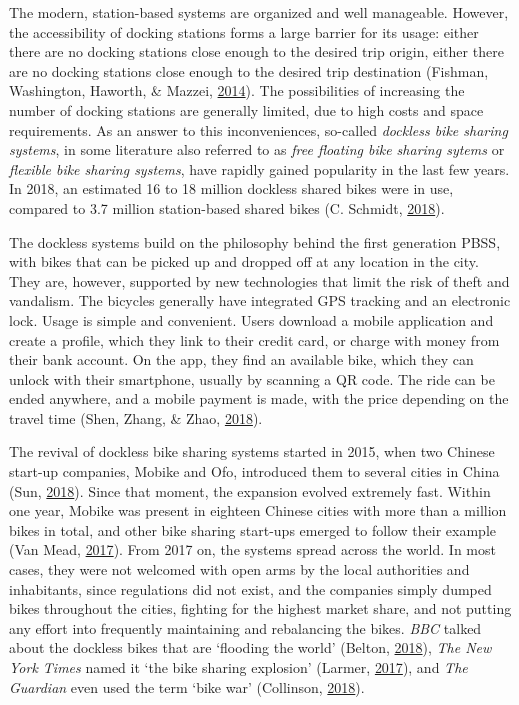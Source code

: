 \documentclass[12pt,oneside]{reedthesis}
\begin{document}
The modern, station-based systems are organized and well manageable.
However, the accessibility of docking stations forms a large barrier for
its usage: either there are no docking stations close enough to the
desired trip origin, either there are no docking stations close enough
to the desired trip destination (Fishman, Washington, Haworth, \&
Mazzei, \protect\hyperlink{ref-fishman2014}{2014}). The possibilities of
increasing the number of docking stations are generally limited, due to
high costs and space requirements. As an answer to this inconveniences,
so-called \emph{dockless bike sharing systems}, in some literature also
referred to as \emph{free floating bike sharing sytems} or
\emph{flexible bike sharing systems}, have rapidly gained popularity in
the last few years. In 2018, an estimated 16 to 18 million dockless
shared bikes were in use, compared to 3.7 million station-based shared
bikes (C. Schmidt, \protect\hyperlink{ref-schmidt2018}{2018}).

The dockless systems build on the philosophy behind the first generation
PBSS, with bikes that can be picked up and dropped off at any location
in the city. They are, however, supported by new technologies that limit
the risk of theft and vandalism. The bicycles generally have integrated
GPS tracking and an electronic lock. Usage is simple and convenient.
Users download a mobile application and create a profile, which they
link to their credit card, or charge with money from their bank account.
On the app, they find an available bike, which they can unlock with
their smartphone, usually by scanning a QR code. The ride can be ended
anywhere, and a mobile payment is made, with the price depending on the
travel time (Shen, Zhang, \& Zhao,
\protect\hyperlink{ref-shen2018}{2018}).

The revival of dockless bike sharing systems started in 2015, when two
Chinese start-up companies, Mobike and Ofo, introduced them to several
cities in China (Sun, \protect\hyperlink{ref-sun2018}{2018}). Since that
moment, the expansion evolved extremely fast. Within one year, Mobike
was present in eighteen Chinese cities with more than a million bikes in
total, and other bike sharing start-ups emerged to follow their example
(Van Mead, \protect\hyperlink{ref-guardian1}{2017}). From 2017 on, the
systems spread across the world. In most cases, they were not welcomed
with open arms by the local authorities and inhabitants, since
regulations did not exist, and the companies simply dumped bikes
throughout the cities, fighting for the highest market share, and not
putting any effort into frequently maintaining and rebalancing the
bikes. \emph{BBC} talked about the dockless bikes that are `flooding the
world' (Belton, \protect\hyperlink{ref-bbc}{2018}), \emph{The New York
Times} named it `the bike sharing explosion' (Larmer,
\protect\hyperlink{ref-nytimes}{2017}), and \emph{The Guardian} even
used the term `bike war' (Collinson,
\protect\hyperlink{ref-guardian2}{2018}).
\end{document}
